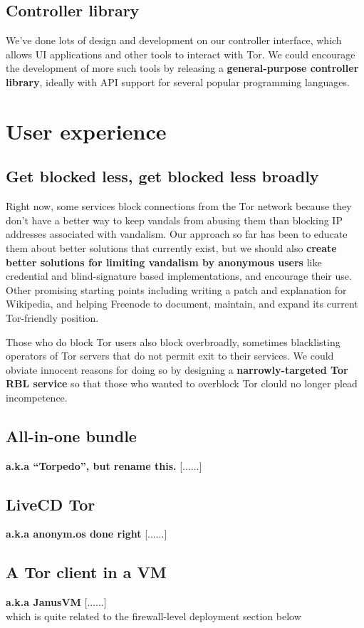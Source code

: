 \documentclass{article}
\newcommand{\tmp}[1]{{\bf #1} [......] \\}
\begin{document}
\subsection{Controller library}
We've done lots of design and development on our controller interface, which
allows UI applications and other tools to interact with Tor.  We could
encourage the development of more such tools by releasing a {\bf
  general-purpose controller library}, ideally with API support for several
popular programming languages.

\section{User experience}

\subsection{Get blocked less, get blocked less broadly}
Right now, some services block connections from the Tor network because
they don't have a better
way to keep vandals from abusing them than blocking IP addresses associated
with vandalism.  Our approach so far has been to educate them about better
solutions that currently exist, but we should also {\bf create better
solutions for limiting vandalism by anonymous users} like credential and
blind-signature based implementations, and encourage their use. Other
promising starting points including writing a patch and explanation for
Wikipedia, and helping Freenode to document, maintain, and expand its
current Tor-friendly position.

Those who do block Tor users also block overbroadly, sometimes blacklisting
operators of Tor servers that do not permit exit to their services.  We could
obviate innocent reasons for doing so by designing a {\bf narrowly-targeted Tor
  RBL service} so that those who wanted to overblock Tor clould no longer
plead incompetence.

\subsection{All-in-one bundle}
\tmp{a.k.a ``Torpedo'', but rename this.}

\subsection{LiveCD Tor}
\tmp{a.k.a anonym.os done right}

\subsection{A Tor client in a VM}
\tmp{a.k.a JanusVM} which is quite related to the firewall-level deployment
section below
\end{document}
